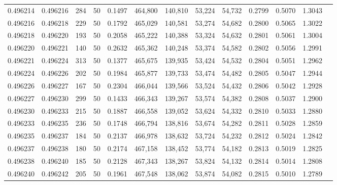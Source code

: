 \begin{tabular}{rrrrrrrrrrrrr}
0.496214 & 0.496216 &   284 &  50 &                                     0.1497 & 464,800 & 140,810 &  53,224 &  54,732 & 0.2799 & 0.5070 & 1.3043 \\
0.496216 & 0.496218 &   229 &  50 &                                     0.1792 & 465,029 & 140,581 &  53,274 &  54,682 & 0.2800 & 0.5065 & 1.3022 \\
0.496218 & 0.496220 &   193 &  50 &                                     0.2058 & 465,222 & 140,388 &  53,324 &  54,632 & 0.2801 & 0.5061 & 1.3004 \\
0.496220 & 0.496221 &   140 &  50 &                                     0.2632 & 465,362 & 140,248 &  53,374 &  54,582 & 0.2802 & 0.5056 & 1.2991 \\
0.496221 & 0.496224 &   313 &  50 &                                     0.1377 & 465,675 & 139,935 &  53,424 &  54,532 & 0.2804 & 0.5051 & 1.2962 \\
0.496224 & 0.496226 &   202 &  50 &                                     0.1984 & 465,877 & 139,733 &  53,474 &  54,482 & 0.2805 & 0.5047 & 1.2944 \\
0.496226 & 0.496227 &   167 &  50 &                                     0.2304 & 466,044 & 139,566 &  53,524 &  54,432 & 0.2806 & 0.5042 & 1.2928 \\
0.496227 & 0.496230 &   299 &  50 &                                     0.1433 & 466,343 & 139,267 &  53,574 &  54,382 & 0.2808 & 0.5037 & 1.2900 \\
0.496230 & 0.496233 &   215 &  50 &                                     0.1887 & 466,558 & 139,052 &  53,624 &  54,332 & 0.2810 & 0.5033 & 1.2880 \\
0.496233 & 0.496235 &   236 &  50 &                                     0.1748 & 466,794 & 138,816 &  53,674 &  54,282 & 0.2811 & 0.5028 & 1.2859 \\
0.496235 & 0.496237 &   184 &  50 &                                     0.2137 & 466,978 & 138,632 &  53,724 &  54,232 & 0.2812 & 0.5024 & 1.2842 \\
0.496237 & 0.496238 &   180 &  50 &                                     0.2174 & 467,158 & 138,452 &  53,774 &  54,182 & 0.2813 & 0.5019 & 1.2825 \\
0.496238 & 0.496240 &   185 &  50 &                                     0.2128 & 467,343 & 138,267 &  53,824 &  54,132 & 0.2814 & 0.5014 & 1.2808 \\
0.496240 & 0.496242 &   205 &  50 &                                     0.1961 & 467,548 & 138,062 &  53,874 &  54,082 & 0.2815 & 0.5010 & 1.2789 \\

\end{tabular}
